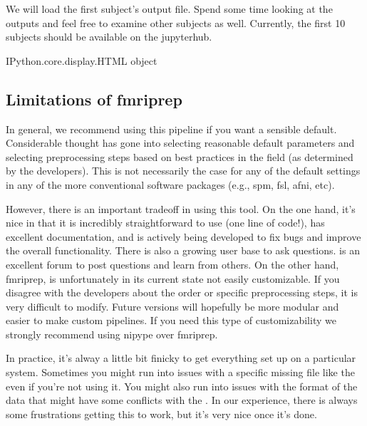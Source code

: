 \documentclass[letterpaper,10pt,english]{sphinxmanual}
\begin{document}
We will load the first subject’s output file. Spend some time looking at the outputs and feel free to examine other subjects as well. Currently, the first 10 subjects should be available on the jupyterhub.

\begin{sphinxVerbatim}[commandchars=\\\{\}]
   

\end{sphinxVerbatim}

\begin{sphinxVerbatim}[commandchars=\\\{\}]
\PYGZlt{}IPython.core.display.HTML object\PYGZgt{}
\end{sphinxVerbatim}


\subsection{Limitations of fmriprep}
\label{\detokenize{content/Preprocessing:limitations-of-fmriprep}}
In general, we recommend using this pipeline if you want a sensible default. Considerable thought has gone into selecting reasonable default parameters and selecting preprocessing steps based on best practices in the field (as determined by the developers). This is not necessarily the case for any of the default settings in any of the more conventional software packages (e.g., spm, fsl, afni, etc).

However, there is an important tradeoff in using this tool. On the one hand, it’s nice in that it is incredibly straightforward to use (one line of code!), has excellent documentation, and is actively being developed to fix bugs and improve the overall functionality. There is also a growing user base to ask questions.   is an excellent forum to post questions and learn from others. On the other hand, fmriprep, is unfortunately in its current state not easily customizable. If you disagree with the developers about the order or specific preprocessing steps, it is very difficult to modify. Future versions will hopefully be more modular and easier to make custom pipelines.  If you need this type of customizability we strongly recommend using nipype over fmriprep.

In practice, it’s alway a little bit finicky to get everything set up on a particular system. Sometimes you might run into issues with a specific missing file like the  even if you’re not using it. You might also run into issues with the format of the data that might have some conflicts with the . In our experience, there is always some frustrations getting this to work, but it’s very nice once it’s done.
\end{document}
